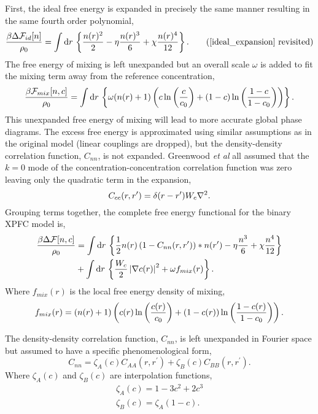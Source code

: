 First, the ideal free energy is expanded in precisely the same manner resulting
in the same fourth order polynomial,
%
\begin{equation}
    \f{\beta\Delta\F_{id}[n]}{\rho_0} = \integrate{r}
        \l\lbrace \f{n(r)^2}{2} - \eta \f{n(r)^3}{6} + \chi\f{n(r)^4}{12}
        \r\rbrace. \tag{\ref{ideal_expansion} revisited}
\end{equation}
%
The free energy of mixing is left unexpanded but an overall scale $\omega$ is
added to fit the mixing term away from the reference concentration,
%
\begin{equation}
    \frac{\beta\mathcal{F}_{mix}[n, c]}{\rho_0} =
        \int \mathrm{d}r\, \left\lbrace \omega (n(r) + 1)\left( 
            c\ln\left(\frac{c}{c_0}\right) + (1-c)\ln\left(\frac{1-c}{1-c_0}\right) \right)\right\rbrace. 
\end{equation}
%
This unexpanded free energy of mixing will lead to more accurate global phase
diagrams. The excess free energy is approximated using similar assumptions as
in the original model (linear couplings are dropped), but the density-density
correlation function, $C_{nn}$, is not expanded. Greenwood \textit{et al} all
assumed that the $k=0$ mode of the concentration-concentration correlation
function was zero leaving only the quadratic term in the expansion,
%
\begin{equation}
    C_{cc}(r, r^\prime) = \delta(r - r^\prime)W_c \nabla^2.
\end{equation}
%
Grouping terms together, the complete free energy functional for the binary XPFC
model is,
%
\begin{align}
    \frac{\beta\Delta\mathcal{F}[n, c]}{\rho_0} &= \int \mathrm{d}r\, \left\lbrace
        \frac{1}{2} n(r) \left(1 - C_{nn}(r, r^\prime)\right) \ast n(r^\prime)
        - \eta \frac{n^3}{6} + \chi \frac{n^4}{12} \right\rbrace \\
        &+ \int \mathrm{d}r\,\left\lbrace
            \frac{W_c}{2}\left\vert \nabla c(r) \right\vert^2 + \omega f_{mix}(r)
            \right\rbrace. \nonumber
\end{align}
%
Where $f_{mix}(r)$ is the local free energy density of mixing,
%
\begin{equation}
    f_{mix}(r) = \left(n(r) + 1\right)\left( 
            c(r)\ln\left(\frac{c(r)}{c_0}\right) + (1-c(r))\ln\left(\frac{1-c(r)}{1-c_0}\right) \right).
\end{equation}
%

The density-density correlation function, $C_{nn}$, is left unexpanded in 
Fourier space but assumed to have a specific phenomenological form,
%
\begin{equation}
    \label{eq:xpfc_corr}
    C_{nn} = \zeta_A(c) C_{AA}(r, r^\prime) 
           + \zeta_B(c) C_{BB}(r, r^\prime).
\end{equation}
%
Where $\zeta_A(c)$ and $\zeta_B(c)$ are interpolation functions,
%
\begin{gather}
    \zeta_A(c) = 1 - 3c^2 + 2c^3 \\
    \zeta_B(c) = \zeta_A(1 - c).
\end{gather}
%

